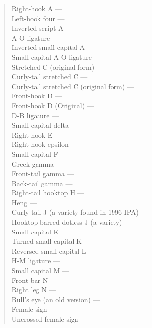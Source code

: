 \begin{quote}
Right-hook A --- \textrhooka\\
Left-hook four --- \textlhookfour\\
Inverted script A --- \textinvscripta\\
A-O ligature --- \textaolig\\
Inverted small capital A --- \textinvsca\\
Small capital A-O ligature --- \textscaolig\\
Stretched C (original form) --- \textstretchcvar\\
Curly-tail stretched C --- \textctstretchc\\
Curly-tail stretched C (original form) --- \textctstretchcvar\\
Front-hook D --- \textfrhookd\\
Front-hook D (Original) --- \textfrhookdvar\\
D-B ligature --- \textdblig\\
Small capital delta --- \textscdelta\\
Right-hook E --- \textrhooke\\
Right-hook epsilon --- \textrhookepsilon\\
Small capital F --- \textscf\\
Greek gamma --- \textgrgamma\\
Front-tail gamma --- \textfrtailgamma\\
Back-tail gamma --- \textbktailgamma\\
Right-tail hooktop H --- \textrtailhth\\
Heng --- \textheng\\
Curly-tail J (a variety found in 1996 IPA) --- \textctjvar\\
Hooktop barred dotless J (a variety) --- \texthtbardotlessjvar\\
Small capital K --- \textsck\\
Turned small capital K --- \textturnsck\\
Reversed small capital L --- \textrevscl\\
H-M ligature --- \texthmlig\\
Small capital M --- \textscm\\
Front-bar N --- \textfrbarn\\
Right leg N --- \textnrleg\\
Bull's eye (an old version) --- \textObullseye\\
Female sign --- \textfemale\\
Uncrossed female sign --- \textuncrfemale\\

\end{quote}
